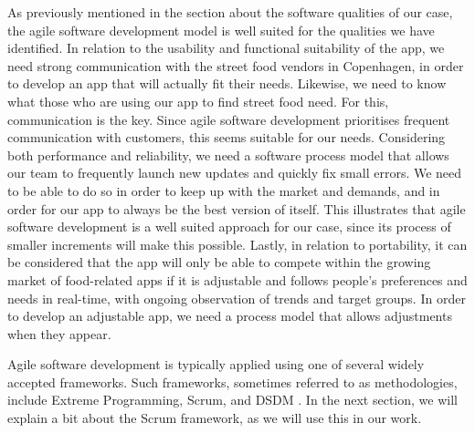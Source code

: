 As previously mentioned in the section about the software qualities of our case, the agile software development model is well suited for the qualities we have identified. In relation to the usability and functional suitability of the app, we need strong communication with the street food vendors in Copenhagen, in order to develop an app that will actually fit their needs. Likewise, we need to know what those who are using our app to find street food need. For this, communication is the key. Since agile software development prioritises frequent communication with customers, this seems suitable for our needs. Considering both performance and reliability, we need a software process model that allows our team to frequently launch new updates and quickly fix small errors. We need to be able to do so in order to keep up with the market and demands, and in order for our app to always be the best version of itself. This illustrates that agile software development is a well suited approach for our case, since its process of smaller increments will make this possible. Lastly, in relation to portability, it can be considered that the app will only be able to compete within the growing market of food-related apps if it is adjustable and follows people’s preferences and needs in real-time, with ongoing observation of trends and target groups. In order to develop an adjustable app, we need a process model that allows adjustments when they appear.

Agile software development is typically applied using one of several widely accepted frameworks. Such frameworks, sometimes referred to as methodologies, include Extreme Programming, Scrum, and DSDM \cite[p.73]{Sommerville}. In the next section, we will explain a bit about the Scrum framework, as we will use this in our work.
